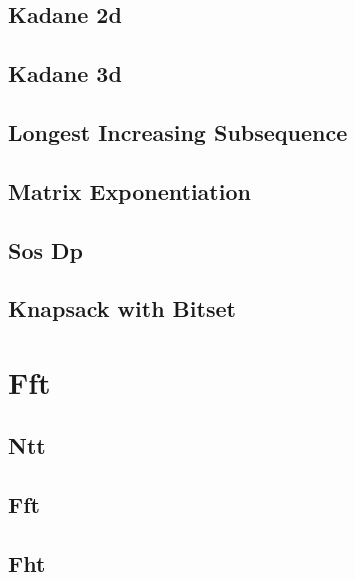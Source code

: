 \documentclass[10pt]{article}
\begin{document}
\subsection{\texorpdfstring{{Kadane 2d}}{{Kadane 2d}}}

\subsection{\texorpdfstring{{Kadane 3d}}{{Kadane 3d}}}

\subsection{\texorpdfstring{{Longest Increasing Subsequence}}{{Longest Increasing Subsequence}}}

\subsection{\texorpdfstring{{Matrix Exponentiation}}{{Matrix Exponentiation}}}

\subsection{\texorpdfstring{{Sos Dp}}{{Sos Dp}}}

\subsection{\texorpdfstring{{Knapsack with Bitset}}{{Knapsack with Bitset}}}


\section{Fft}
\subsection{\texorpdfstring{{Ntt}}{{Ntt}}}

\subsection{\texorpdfstring{{Fft}}{{Fft}}}

\subsection{\texorpdfstring{{Fht}}{{Fht}}}

\end{document}
